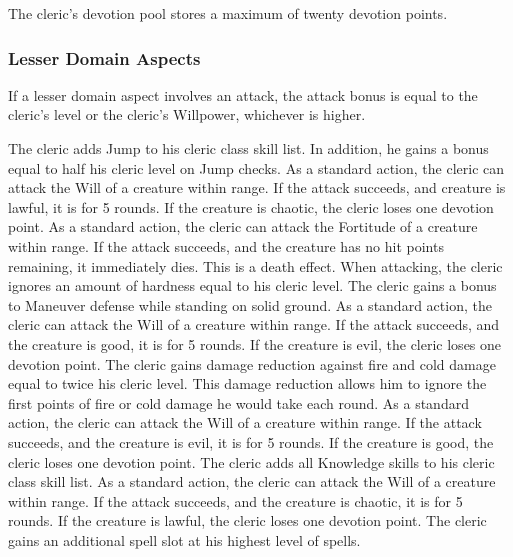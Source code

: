 The cleric's devotion pool stores a maximum of twenty devotion points.


\subsubsection{Lesser Domain Aspects}\label{Lesser Domain Aspects}
If a lesser domain aspect involves an attack, the attack bonus is equal to the cleric's level or the cleric's Willpower, whichever is higher.

The cleric adds Jump to his cleric class skill list.
In addition, he gains a bonus equal to half his cleric level on Jump checks.
As a standard action, the cleric can attack the Will of a creature within \rngclose range.
If the attack succeeds, and creature is lawful, it is \disoriented for 5 rounds.
If the creature is chaotic, the cleric loses one devotion point.
\norepeatnotes
{}
As a standard action, the cleric can attack the Fortitude of a creature within \rngclose range.
If the attack succeeds, and the creature has no hit points remaining, it immediately dies.
This is a death effect.
When attacking, the cleric ignores an amount of hardness equal to his cleric level.
The cleric gains a  bonus to Maneuver defense while standing on solid ground.
As a standard action, the cleric can attack the Will of a creature within \rngclose range.
If the attack succeeds, and the creature is good, it is \staggered for 5 rounds.
If the creature is evil, the cleric loses one devotion point.
\norepeatnotes
{}
The cleric gains damage reduction against fire and cold damage equal to twice his cleric level.
This damage reduction allows him to ignore the first points of fire or cold damage he would take each round.
As a standard action, the cleric can attack the Will of a creature within \rngclose range.
If the attack succeeds, and the creature is evil, it is \dazed for 5 rounds.
If the creature is good, the cleric loses one devotion point.
\norepeatnotes
{}
The cleric adds all Knowledge skills to his cleric class skill list.
As a standard action, the cleric can attack the Will of a creature within \rngclose range.
If the attack succeeds, and the creature is chaotic, it is \staggered for 5 rounds.
If the creature is lawful, the cleric loses one devotion point.
\norepeatnotes
{}
The cleric gains an additional spell slot at his highest level of spells.

